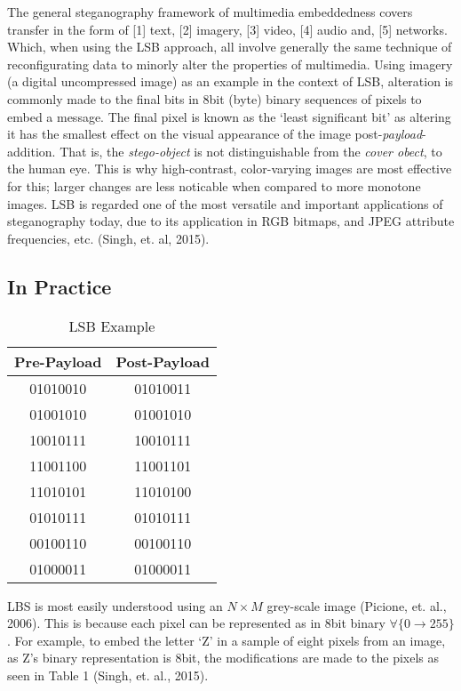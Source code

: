 \documentclass[11pt, english]{article}
\begin{document}
	The general steganography framework of multimedia embeddedness covers transfer in the form of [1] text, [2] imagery, [3] video, [4] audio and, [5] networks. Which, when using the LSB approach, all involve generally the same technique of reconfigurating data to minorly alter the properties of multimedia. Using imagery (a digital uncompressed image) as an example in the context of LSB, alteration is commonly made to the final bits in 8bit (byte) binary sequences of pixels to embed a message. The final pixel is known as the `least significant bit' as altering it has the smallest effect on the visual appearance of the image post-\textit{payload}-addition. That is, the \textit{stego-object} is not distinguishable from the \textit{cover obect}, to the human eye. This is why high-contrast, color-varying images are most effective for this; larger changes are less noticable when compared to more monotone images. LSB is regarded one of the most versatile and important applications of steganography today, due to its application in RGB bitmaps, and JPEG attribute frequencies, etc. (Singh, et. al, 2015).\\

	\subsection{In Practice}

	\begin{table}[h]
		\scriptsize
	\begin{center}
	\begin{tabular}{cc}
		\hline
		\textbf{Pre-Payload} & \textbf{Post-Payload}\\
		\hline
		01010010 & 01010011\\
		01001010 & 01001010\\
		10010111 & 10010111\\
		11001100 & 11001101\\
		11010101 & 11010100\\
		01010111 & 01010111\\
		00100110 & 00100110\\
		01000011 & 01000011\\
		\hline
	\end{tabular}
		\caption{LSB Example}
	\end{center}
	\end{table}

	LBS is most easily understood using an $N\times M$ grey-scale image (Picione, et. al., 2006). This is because each pixel can be represented as in 8bit binary $\forall\{0\longrightarrow255\}$. For example, to embed the letter `Z' in a sample of eight pixels from an image, as Z's binary representation is 8bit, the modifications are made to the pixels as seen in Table 1 (Singh, et. al., 2015).
\end{document}
